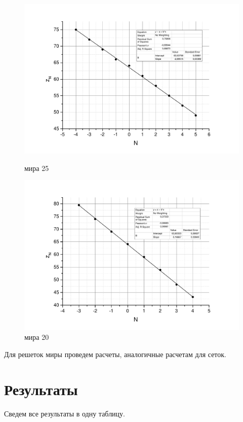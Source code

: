 \documentclass[a4paper, 12pt]{article}
\begin{document}
	\begin{figure}[h!]
		\begin{center}
			\begin{minipage}{0.49\textwidth}
				\includegraphics[width=\textwidth]{mira_25}
				\caption{мира 25}
			\end{minipage}
			\hfill
			\begin{minipage}{0.49\textwidth}
				\includegraphics[width=\textwidth]{mira_20}
				\caption{мира 20}
			\end{minipage}
		\end{center}
	\end{figure}
	
	Для решеток миры проведем расчеты, аналогичные расчетам для сеток.
	
	\section{Результаты}
	Сведем все результаты в одну таблицу.
	
\end{document}
